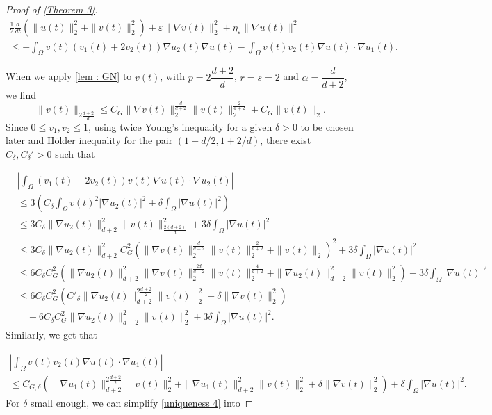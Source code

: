 \documentclass[reqno,12pt,twoside]{amsart}
\numberwithin{equation}{section} \numberwithin{theorem}{section}
\numberwithin{proposition}{section} \numberwithin{lemma}{section}
\numberwithin{corollary}{section}
\numberwithin{definition}{section} \numberwithin{remark}{section}
\begin{document}
\begin{proof}[Proof of \autoref{Theorem 3}]
\begin{multline}\label{uniqueness 4}
\frac{1}{2} \frac{d}{dt} \left(\|u(t)\|_2^2+ \|v(t)\|_2^2\right) +\varepsilon\|\nabla v(t)\|_2^2 +\eta_\varepsilon \|\nabla u(t)\|^2 \\
\leqslant - \int_\Omega  v(t)(v_1(t)+2v_2(t)) \nabla u_2(t) \nabla u(t) - \int_\Omega v(t) v_2(t) \nabla u(t) \cdot \nabla u_1(t). 
\end{multline}

When we apply \autoref{lem : GN} to $v(t)$, with $p = 2 \dfrac{d+2}{d}$, $r=s=2$ and $\alpha = \dfrac{d}{d+2}$, we find
\[\|v(t)\|_{2\frac{d+2}{d}} \leqslant C_G \|\nabla v(t)\|_2^{\frac{d}{d+2}} \|v(t)\|_2^{\frac{2}{d+2}} + C_G \|v(t)\|_2.\] 
Since $0\leqslant v_1, v_2\leqslant 1$, using twice Young's inequality for a given $\delta >0$ to be chosen later and Hölder inequality for the pair $(1+d/2,1+2/d)$, there exist $C_\delta, C_\delta ' >0$ such that  

\begin{align*}
&\left|\int_\Omega (v_1(t) +2v_2(t)) v(t) \nabla u(t) \cdot \nabla u_2(t)\right| \\
&\leqslant 3 \left(C_\delta \int_\Omega v(t)^2 |\nabla u_2(t)|^2 + \delta \int_\Omega |\nabla u(t)|^2\right) \\
& \leqslant 3C_\delta \|\nabla u_2(t)\|_{d+2}^2 \|v(t)\|_{\frac{2(d+2)}{d}}^2 + 3\delta\int_\Omega |\nabla u(t)|^2\\
&\leqslant 3C_\delta \|\nabla u_2(t)\|_{d+2}^2 C_G^2 \left( \|\nabla v(t)\|_2^{\frac{d}{d+2}} \|v(t)\|_2^{\frac{2}{d+2}} + \|v(t)\|_2\right)^2 + 3\delta\int_\Omega |\nabla u(t)|^2\\
&\leqslant 6C_\delta C_G^2 \left(\|\nabla u_2(t)\|_{d+2}^2 \|\nabla v(t)\|_2^{\frac{2d}{d+2}} \|v(t)\|_2^{\frac{4}{d+2}} + \|\nabla u_2(t)\|_{d+2}^2 \|v(t)\|_2^2 \right)+ 3\delta\int_\Omega |\nabla u(t)|^2\\
&\leqslant 6C_\delta C_G^2 \left(C'_\delta \|\nabla u_2(t)\|_{d+2}^{2\frac{d+2}{2}} \|v(t)\|_2^2  + \delta \|\nabla v(t)\|_2^2 \right)\\
&\quad + 6C_\delta C_G^2 \|\nabla u_2(t)\|_{d+2}^2 \|v(t)\|_2^2 + 3\delta\int_\Omega |\nabla u(t)|^2.
\end{align*}
Similarly, we get that 

\begin{multline*}
\left|\int_\Omega v(t) v_2(t) \nabla u(t) \cdot \nabla u_1(t) \right| \\
\leqslant C_{G,\delta} \left(\|\nabla u_1 (t)\|_{d+2}^{2\frac{d+2}{2}} \|v(t)\|_2^2 + \|\nabla u_1(t)\|_{d+2}^2\|v(t)\|_2^2 + \delta \|\nabla v(t)\|_2^2 \right) +\delta \int_{\Omega} |\nabla u(t)|^2.
\end{multline*}
For $\delta$ small enough, we can simplify \eqref{uniqueness 4} into 


\end{proof}
\end{document}
